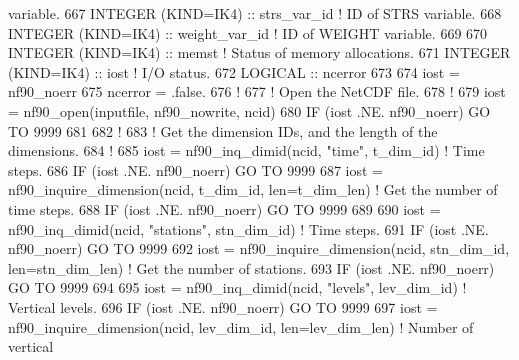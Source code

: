 \begin{DoxyCode}
{       variable.}
667     \textcolor{keywordtype}{INTEGER (KIND=IK4)}          :: strs\_var\_id                                          \textcolor{comment}{! ID of STRS
       variable.}
668     \textcolor{keywordtype}{INTEGER (KIND=IK4)}          :: weight\_var\_id                                        \textcolor{comment}{! ID of WEIGHT
       variable.}
669 
670     \textcolor{keywordtype}{INTEGER (KIND=IK4)}          :: memst                                                \textcolor{comment}{! Status of memory
       allocations.}
671     \textcolor{keywordtype}{INTEGER (KIND=IK4)}          :: iost                                                 \textcolor{comment}{! I/O status.}
672     \textcolor{keywordtype}{LOGICAL}                     :: ncerror
673 
674     iost    = nf90\_noerr
675     ncerror = .false.
676     \textcolor{comment}{!}
677     \textcolor{comment}{! Open the NetCDF file.}
678     \textcolor{comment}{!}
679     iost    = nf90\_open(inputfile, nf90\_nowrite, ncid)
680     \textcolor{keywordflow}{IF} (iost .NE. nf90\_noerr) \textcolor{keywordflow}{GO TO} 9999
681 
682     \textcolor{comment}{!}
683     \textcolor{comment}{! Get the dimension IDs, and the length of the dimensions.}
684     \textcolor{comment}{!}
685     iost    = nf90\_inq\_dimid(ncid, \textcolor{stringliteral}{"time"}, t\_dim\_id)                            \textcolor{comment}{! Time steps.}
686     \textcolor{keywordflow}{IF} (iost .NE. nf90\_noerr) \textcolor{keywordflow}{GO TO} 9999
687     iost    = nf90\_inquire\_dimension(ncid, t\_dim\_id, len=t\_dim\_len)             \textcolor{comment}{! Get the number of time
       steps.}
688     \textcolor{keywordflow}{IF} (iost .NE. nf90\_noerr) \textcolor{keywordflow}{GO TO} 9999
689 
690     iost    = nf90\_inq\_dimid(ncid, \textcolor{stringliteral}{"stations"}, stn\_dim\_id)                      \textcolor{comment}{! Time steps.}
691     \textcolor{keywordflow}{IF} (iost .NE. nf90\_noerr) \textcolor{keywordflow}{GO TO} 9999
692     iost    = nf90\_inquire\_dimension(ncid, stn\_dim\_id, len=stn\_dim\_len)         \textcolor{comment}{! Get the number of
       stations.}
693     \textcolor{keywordflow}{IF} (iost .NE. nf90\_noerr) \textcolor{keywordflow}{GO TO} 9999
694 
695     iost    = nf90\_inq\_dimid(ncid, \textcolor{stringliteral}{"levels"}, lev\_dim\_id)                        \textcolor{comment}{! Vertical levels.}
696     \textcolor{keywordflow}{IF} (iost .NE. nf90\_noerr) \textcolor{keywordflow}{GO TO} 9999
697     iost    = nf90\_inquire\_dimension(ncid, lev\_dim\_id, len=lev\_dim\_len)         \textcolor{comment}{! Number of vertical
}
\end{DoxyCode}
